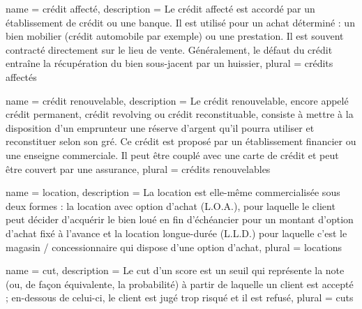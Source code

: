 {
	name = crédit affecté,
	description = {Le crédit affecté est accordé par un établissement de crédit ou une banque. Il est utilisé pour un achat déterminé : un bien mobilier (crédit automobile par exemple) ou une prestation. Il est souvent contracté directement sur le lieu de vente. Généralement, le défaut du crédit entraîne la récupération du bien sous-jacent par un huissier},
	plural = crédits affectés
}

{
	name = crédit renouvelable,
	description = {Le crédit renouvelable, encore appelé crédit permanent, crédit revolving ou crédit reconstituable, consiste à mettre à la disposition d'un emprunteur une réserve d'argent qu'il pourra utiliser et reconstituer selon son gré. Ce crédit est proposé par un établissement financier ou une enseigne commerciale. Il peut être couplé avec une carte de crédit et peut être couvert par une assurance},
	plural = crédits renouvelables
}

{
	name = location,
	description = {La location est elle-même commercialisée sous deux formes : la location avec option d'achat (L.O.A.), pour laquelle le client peut décider d'acquérir le bien loué en fin d'échéancier pour un montant d'option d'achat fixé à l'avance et la location longue-durée (L.L.D.) pour laquelle c'est le magasin / concessionnaire qui dispose d'une option d'achat},
	plural = locations
}

{
	name = cut,
	description = {Le cut d'un score est un seuil qui représente la note (ou, de façon équivalente, la probabilité) à partir de laquelle un client est accepté ; en-dessous de celui-ci, le client est jugé trop risqué et il est refusé},
	plural = cuts
}







